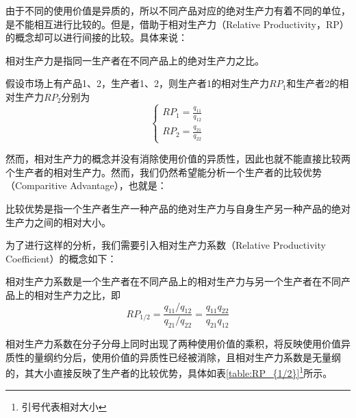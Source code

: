 由于不同的使用价值是异质的，所以不同产品对应的绝对生产力有着不同的单位，是不能相互进行比较的。但是，借助于相对生产力（Relative Productivity，RP）的概念却可以进行间接的比较。具体来说：

\begin{definition}
    相对生产力是指同一生产者在不同产品上的绝对生产力之比\cite[48]{CaiJiMingCongXiaYiJieZhiLunDaoGuangYiJieZhiLunXiuDingBan2022}。
\end{definition}

假设市场上有产品1、2，生产者1、2，则生产者1的相对生产力$RP_1$和生产者2的相对生产力$RP_2$分别为
\begin{equation}
    \begin{cases}
        \mathit{RP}_1=\frac{q_{11}}{q_{12}}\\
        \mathit{RP}_2=\frac{q_{21}}{q_{22}}
    \end{cases}
\end{equation}

然而，相对生产力的概念并没有消除使用价值的异质性，因此也就不能直接比较两个生产者的相对生产力。然而，我们仍然希望能分析一个生产者的比较优势（Comparitive Advantage），也就是：

\begin{definition}
    比较优势是指一个生产者生产一种产品的绝对生产力与自身生产另一种产品的绝对生产力之间的相对大小\cite[49]{CaiJiMingCongXiaYiJieZhiLunDaoGuangYiJieZhiLunXiuDingBan2022}。
\end{definition}

为了进行这样的分析，我们需要引入相对生产力系数（Relative Productivity Coefficient）的概念如下：

\begin{definition}
    相对生产力系数是一个生产者在不同产品上的相对生产力与另一个生产者在不同产品上的相对生产力之比\cite[48]
    {CaiJiMingCongXiaYiJieZhiLunDaoGuangYiJieZhiLunXiuDingBan2022}，即
    \begin{equation}
        \mathit{RP}_{1/2} = \frac{q_{11}/q_{12}}{q_{21}/q_{22}} = \frac{q_{11}q_{22}}{q_{21}q_{12}}
    \end{equation}
\end{definition}

相对生产力系数在分子分母上同时出现了两种使用价值的乘积，将反映使用价值异质性的量纲约分后，使用价值的异质性已经被消除，且相对生产力系数是无量纲的，其大小直接反映了生产者的比较优势，具体如表\ref{table:RP_{1/2}}\footnote{引号代表相对大小}所示。

